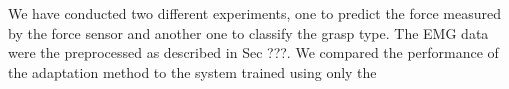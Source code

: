 We have conducted two different experiments, one to predict the force measured
by the force sensor and another one to classify the grasp type.
The EMG data were the preprocessed as described in Sec ???. We compared the
performance of the adaptation method to the system trained using only the 
